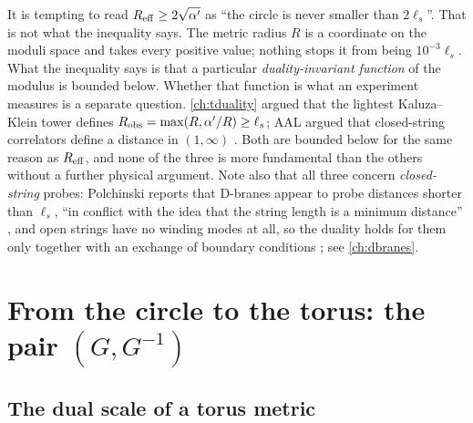 \begin{pitfallbox}
It is tempting to read $R_{\rm eff}\ge2\sqrt{\alpha'}$ as ``the circle is never smaller than
$2\ell_s$''. That is not what the inequality says. The metric radius $R$ is a coordinate on the
moduli space and takes every positive value; nothing stops it from being $10^{-3}\ell_s$. What
the inequality says is that a particular \emph{duality-invariant function} of the modulus is
bounded below. Whether that function is what an experiment measures is a separate question.
\cref{ch:tduality} argued that the lightest Kaluza--Klein tower defines
$R_{\rm obs}=\max(R,\alpha'/R)\ge\ell_s$; AAL argued that closed-string correlators define a
distance in $(1,\infty)$ . Both are bounded below for the same
reason as $R_{\rm eff}$, and none of the three is more fundamental than the others without a
further physical argument. Note also that all three concern \emph{closed-string} probes:
Polchinski reports that D-branes appear to probe distances shorter than $\ell_s$, ``in conflict
with the idea that the string length is a minimum distance'' , and
open strings have no winding modes at all, so the duality holds for them only together with an
exchange of boundary conditions ; see \cref{ch:dbranes}.
\end{pitfallbox}

\section{From the circle to the torus: the pair \texorpdfstring{$(G,G^{-1})$}{(G, G inverse)}}
\label{sec:dualscale:torus}

\subsection{The dual scale of a torus metric}

